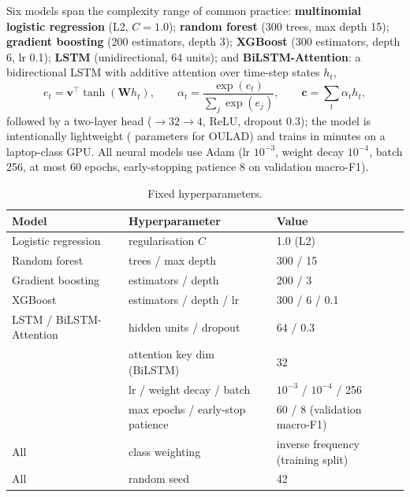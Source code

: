 \documentclass[sn-mathphys,Numbered]{sn-jnl}
\begin{document}
Six models span the complexity range of common practice: \textbf{multinomial logistic regression} (L2, $C{=}1.0$); \textbf{random forest} \cite{Breiman2001} (300 trees, max depth 15); \textbf{gradient boosting} (200 estimators, depth 3); \textbf{XGBoost} \cite{Chen2016} (300 estimators, depth 6, lr 0.1); \textbf{LSTM} \cite{Hochreiter1997} (unidirectional, 64 units); and \textbf{BiLSTM-Attention}: a bidirectional LSTM \cite{Graves2005} with additive attention \cite{Bahdanau2015} over time-step states $h_t$,
\begin{equation}
  e_t = \mathbf{v}^\top \tanh(\mathbf{W} h_t), \qquad
  \alpha_t = \frac{\exp(e_t)}{\sum_j \exp(e_j)}, \qquad
  \mathbf{c} = \sum_t \alpha_t h_t,
\end{equation}
followed by a two-layer head ($\rightarrow 32 \rightarrow 4$, ReLU, dropout 0.3); the model is intentionally lightweight (\bilstmParams{} parameters for OULAD) and trains in minutes on a laptop-class GPU. All neural models use Adam \cite{Kingma2015} (lr $10^{-3}$, weight decay $10^{-4}$, batch 256, at most 60 epochs, early-stopping patience 8 on validation macro-F1).

\begin{table}[ht]
\caption{Fixed hyperparameters.\label{tab:hyperparams}}
\centering\footnotesize
\begin{tabular*}{\textwidth}{@{\extracolsep\fill}lll}
\toprule
\textbf{Model} & \textbf{Hyperparameter} & \textbf{Value} \\
\midrule
Logistic regression & regularisation $C$ & 1.0 (L2) \\
Random forest & trees / max depth & 300 / 15 \\
Gradient boosting & estimators / depth & 200 / 3 \\
XGBoost & estimators / depth / lr & 300 / 6 / 0.1 \\
LSTM / BiLSTM-Attention & hidden units / dropout & 64 / 0.3 \\
 & attention key dim (BiLSTM) & 32 \\
 & lr / weight decay / batch & $10^{-3}$ / $10^{-4}$ / 256 \\
 & max epochs / early-stop patience & 60 / 8 (validation macro-F1) \\
All & class weighting & inverse frequency (training split) \\
All & random seed & 42 \\
\bottomrule
\end{tabular*}
\end{table}
\end{document}
